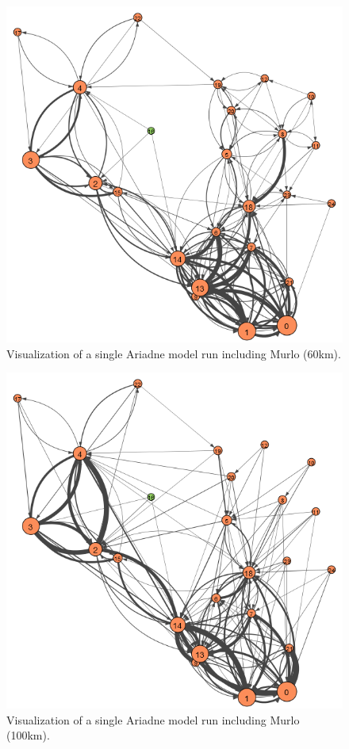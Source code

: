 \documentclass[12pt,a4paper]{thesis}
\begin{document}
\begin{figure}[H]
\centering
\includegraphics[width=0.9\linewidth]{./BeforeViz/ariadne60}
\caption{Visualization of a single Ariadne model run including Murlo (60km).}
\label{fig:ariadneB60}
\end{figure}

\begin{figure}[H]
\centering
\includegraphics[width=0.9\linewidth]{./BeforeViz/ariadne100}
\caption{Visualization of a single Ariadne model run including Murlo (100km).}
\label{fig:ariadneB100}
\end{figure}
\end{document}
